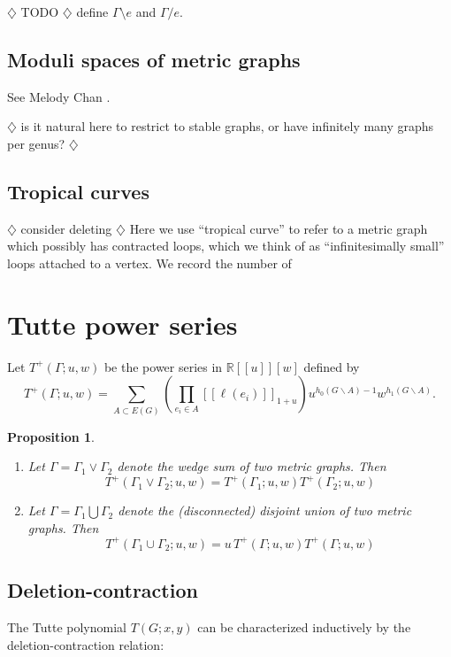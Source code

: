\documentclass{amsart}
\newtheorem{prop}[thm]{Proposition}
\theoremstyle{definition}
\newcommand{\RR}{\mathbb{R}}
\newcommand{\fanalog}[2]{[\![#2]\!]_{#1}}
\newcommand{\harry}[1]{{\color{red} \sf $\diamondsuit$  {#1} $\diamondsuit$ }}
\newcommand{\note}[1]{\harry{#1}}
\begin{document}
\note{TODO} define $\Gamma \setminus e$ and $\Gamma / e$.

\subsection{Moduli spaces of metric graphs}
See Melody Chan \cite{Cha}.

\cite{ACP}

\note{is it natural here to restrict to stable graphs, or have infinitely many graphs per genus?}

\subsection{Tropical curves}

\note{consider deleting}
Here we use ``tropical curve'' 
to refer to a metric graph which possibly has contracted loops,
which we think of as ``infinitesimally small'' loops attached to a vertex.
We record the number of 


\section{Tutte power series}

Let $T^+(\Gamma; u,w)$ be the power series in $\RR[[u]][w]$
defined by
\begin{equation}
	T^+(\Gamma; u,w) = \sum_{A \subset E(G)} \left( \prod_{e_i \in A} \fanalog{1 + u}{\ell(e_i)} \right)
	u^{h_0(G\backslash A) - 1}w^{h_1(G\backslash A)} .
\end{equation}


\begin{prop}
\hfill
\begin{enumerate}
\item 
Let $\Gamma = \Gamma_1 \vee \Gamma_2$ denote the wedge sum of two metric graphs. Then
\[
	T^+(\Gamma_1 \vee \Gamma_2; u,w) = T^+(\Gamma_1; u,w) T^+(\Gamma_2; u,w)
\]

\item 
Let $\Gamma = \Gamma_1 \bigcup \Gamma_2$ denote the (disconnected) disjoint union of two metric graphs. Then
\[
	T^+(\Gamma_1 \cup \Gamma_2; u,w) = u\, T^+(\Gamma; u,w) T^+(\Gamma; u,w)
\]

\end{enumerate}
\end{prop}


\subsection{Deletion-contraction}
The Tutte polynomial $T(G; x,y)$ can be characterized inductively by the deletion-contraction relation:
\end{document}
